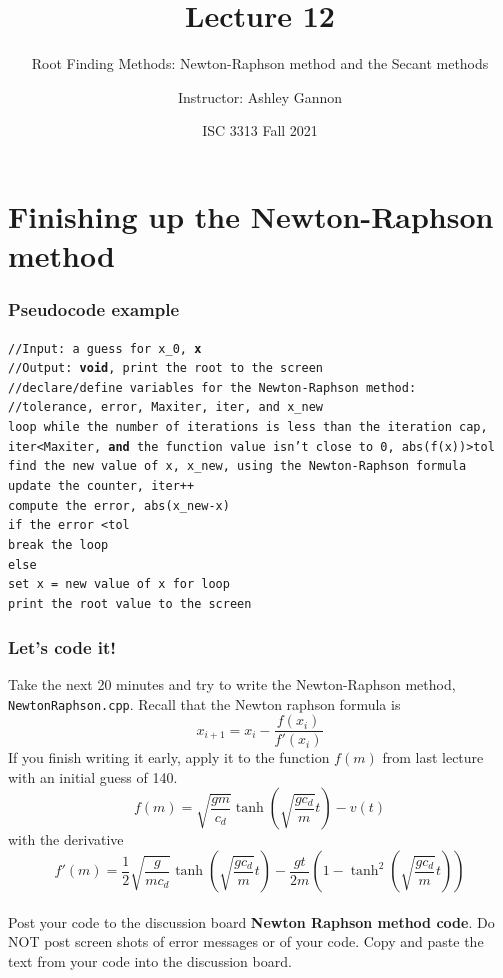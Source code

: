 \documentclass{if-beamer}
\title[Lecture 12]{Lecture 12}
\subtitle{Root Finding Methods: Newton-Raphson method and the Secant methods}
\author{Instructor: Ashley Gannon}
\date{ISC 3313 Fall 2021}
\begin{document}
\begin{frame}
  \titlepage
\end{frame}
\section{Finishing up the Newton-Raphson method}
\begin{frame}
\frametitle{Pseudocode example}
\texttt{//Input: a guess for x\_0, \textbf{x}}\\
\texttt{//Output: \textbf{void}, print the root to the screen} \\
\vspace{7pt}
\texttt{//declare/define variables for the Newton-Raphson method:}\\
\texttt{\qquad //tolerance, error, Maxiter, iter, and x\_new}\\
\vspace{7pt}
\texttt{loop while the number of iterations is less than the iteration cap, iter<Maxiter, \textbf{and} the function value isn't close to 0, abs(f(x))>tol}\\
\vspace{4pt}
\texttt{\qquad find the new value of x, x\_new, using the Newton-Raphson formula}\\
\vspace{4pt}
\texttt{\qquad update the counter, iter++}\\
\vspace{4pt}
\texttt{\qquad compute the error, abs(x\_new-x)}\\
\vspace{4pt}
\texttt{\qquad if the error <tol }\\
\texttt{\qquad \qquad break the loop}\\
\texttt{\qquad else} \\
\texttt{\qquad \qquad set x = new value of x for loop} \\
\vspace{4pt}
\texttt{print the root value to the screen}
\end{frame}

\begin{frame}
\frametitle{Let's code it!}

Take the next 20 minutes and try to write the Newton-Raphson method, \texttt{NewtonRaphson.cpp}. Recall that the Newton raphson formula is 
$$x_{i+1} = x_i - \frac{f(x_i)}{f'(x_i)}$$
If you finish writing it early, apply it to the function $f(m)$ from last lecture with an initial guess of 140.
$$f(m) = \sqrt{\frac{gm}{c_d}}\tanh\left(\sqrt{\frac{gc_d}{m}}t\right) -v(t) $$
with the derivative
$$f'(m) = \frac{1}{2}\sqrt{\frac{g}{mc_d}}\tanh\left(\sqrt{\frac{gc_d}{m}}t\right) - \frac{gt}{2m}\left(1-\tanh^2\left(\sqrt{\frac{gc_d}{m}}t\right)\right) $$ 
\\\vspace{7pt}
Post your code to the discussion board \textbf{Newton Raphson method code}. Do NOT post screen shots of error messages or of your code. Copy and paste the text from your code into the discussion board.
\end{frame}
\end{document}
